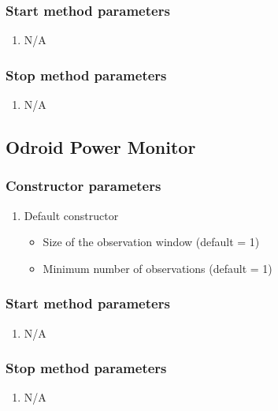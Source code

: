 \subsubsection*{Start method parameters}
\begin{enumerate}
	\item[] N/A
\end{enumerate}


\subsubsection*{Stop method parameters}
\begin{enumerate}
	\item[] N/A
\end{enumerate}




\subsection{Odroid Power Monitor}

\subsubsection*{Constructor parameters}
\begin{enumerate}
	\item Default constructor
		\begin{itemize}
			\item Size of the observation window (default = 1)
			\item Minimum number of observations (default = 1)
		\end{itemize}
\end{enumerate}

\subsubsection*{Start method parameters}
\begin{enumerate}
	\item[] N/A
\end{enumerate}


\subsubsection*{Stop method parameters}
\begin{enumerate}
	\item[] N/A
\end{enumerate}






